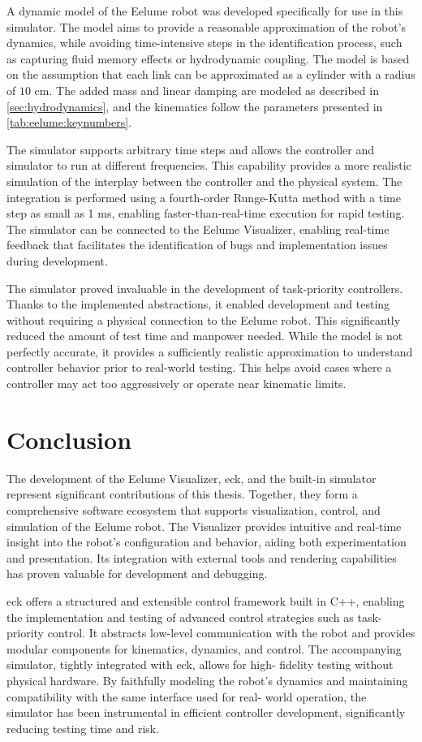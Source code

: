 A dynamic model of the Eelume robot was developed specifically for use in this 
simulator. The model aims to provide a reasonable approximation of the robot’s 
dynamics, while avoiding time-intensive steps in the identification process, 
such as capturing fluid memory effects or hydrodynamic coupling. The model is 
based on the assumption that each link can be approximated as a cylinder with 
a radius of \(10\) cm. The added mass and linear damping are modeled as 
described in \autoref{sec:hydrodynamics}, and the kinematics follow the 
parameters presented in \autoref{tab:eelume:keynumbers}.

The simulator supports arbitrary time steps and allows the controller and 
simulator to run at different frequencies. This capability provides a more 
realistic simulation of the interplay between the controller and the physical 
system. The integration is performed using a fourth-order Runge-Kutta method 
with a time step as small as 1 ms, enabling faster-than-real-time execution 
for rapid testing. The simulator can be connected to the Eelume Visualizer, 
enabling real-time feedback that facilitates the identification of bugs and 
implementation issues during development.

The simulator proved invaluable in the development of task-priority controllers.
Thanks to the implemented abstractions, it enabled development and testing 
without requiring a physical connection to the Eelume robot. This 
significantly reduced the amount of test time and manpower needed. While the 
model is not perfectly accurate, it provides a sufficiently realistic 
approximation to understand controller behavior prior to real-world testing. 
This helps avoid cases where a controller may act too aggressively or operate 
near kinematic limits.

\section{Conclusion}

The development of the Eelume Visualizer, \gls{eck}, and the 
built-in simulator represent significant contributions of this thesis. Together,
they form a comprehensive software ecosystem that supports visualization, 
control, and simulation of the Eelume robot. The Visualizer provides intuitive 
and real-time insight into the robot's configuration and behavior, aiding both 
experimentation and presentation. Its integration with external tools and 
rendering capabilities has proven valuable for development and debugging. 

\gls{eck} offers a structured and extensible control framework built in C++, 
enabling the implementation and testing of advanced control strategies such as 
task-priority control. It abstracts low-level communication with the robot and 
provides modular components for kinematics, dynamics, and control. The 
accompanying simulator, tightly integrated with \gls{eck}, allows for high-
fidelity testing without physical hardware. By faithfully modeling the robot's 
dynamics and maintaining compatibility with the same interface used for real-
world operation, the simulator has been instrumental in efficient controller 
development, significantly reducing testing time and risk.

